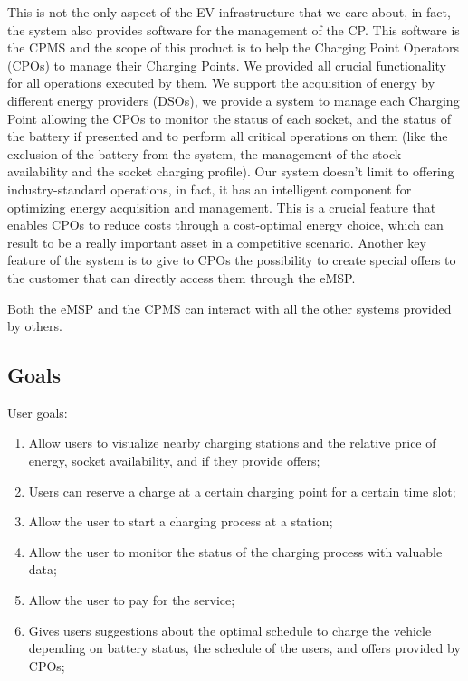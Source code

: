 \documentclass{Configuration_Files/PoliMi3i_thesis}
\begin{document}
This is not the only aspect of the EV infrastructure that we care about, in fact, the system also provides software for the management of the CP. This software is the CPMS and the scope of this product is to help the Charging Point Operators (CPOs) to manage their Charging Points. We provided all crucial functionality for all operations executed by them. We support the acquisition of energy by different energy providers (DSOs), we provide a system to manage each Charging Point allowing the CPOs to monitor the status of each socket, and the status of the battery if presented and to perform all critical operations on them (like the exclusion of the battery from the system, the management of the stock availability and the socket charging profile). 
Our system doesn't limit to offering industry-standard operations, in fact, it has an intelligent component for optimizing energy acquisition and management. This is a crucial feature that enables CPOs to reduce costs through a cost-optimal energy choice, which can result to be a really important asset in a competitive scenario. 
Another key feature of the system is to give to CPOs the possibility to create special offers to the customer that can directly access them through the eMSP. 

Both the eMSP and the CPMS can interact with all the other systems provided by others. 


\subsection{Goals}
User goals:
\begin{enumerate}[label=\textbf{G\arabic*}]

    \item Allow users to visualize nearby charging stations and the relative price of energy, socket availability, and if they provide offers;
    
    \item Users can reserve a charge at a certain charging point for a certain time slot;
    
    \item Allow the user to start a charging process at a station;

    \item Allow the user to monitor the status of the charging process with valuable data;

    \item Allow the user to pay for the service;

    \item Gives users suggestions about the optimal schedule to charge the vehicle depending on battery status, the schedule of the users, and offers provided by CPOs;

\end{enumerate}
\end{document}
